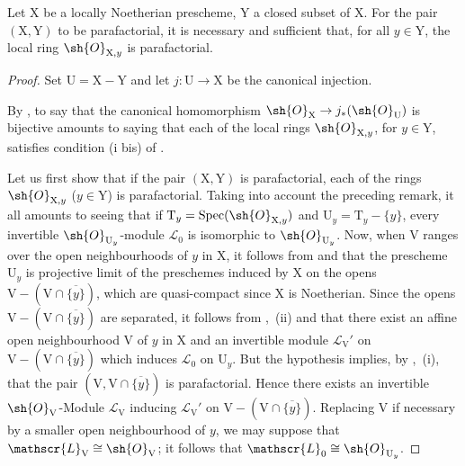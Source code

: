 \begin{proposition}[21.13.10]
\label{IV.21.13.10}
Let $\mathrm{X}$ be a locally Noetherian prescheme, $\mathrm{Y}$ a closed subset of $\mathrm{X}$.
For the pair $(\mathrm{X},\mathrm{Y})$ to be parafactorial, it is necessary and sufficient that, for all $y\in\mathrm{Y}$, the local ring $\sh{O}_{\mathrm{X},y}$ is parafactorial.
\end{proposition}

\begin{proof}
Set $\mathrm{U}=\mathrm{X}-\mathrm{Y}$ and let $j:\mathrm{U}\to\mathrm{X}$ be the canonical injection.

By , to say that the canonical homomorphism $\sh{O}_{\mathrm{X}}\to j_*(\sh{O}_{\mathrm{U}})$ is bijective amounts to saying that each of the local rings $\sh{O}_{\mathrm{X},y}$, for $y\in\mathrm{Y}$, satisfies condition (i bis) of .

Let us first show that if the pair $(\mathrm{X},\mathrm{Y})$ is parafactorial, each of the rings $\sh{O}_{\mathrm{X},y}$ ($y\in\mathrm{Y}$) is parafactorial.
Taking into account the preceding remark, it all amounts to seeing that if $\mathrm{T}_y=\operatorname{Spec}(\sh{O}_{\mathrm{X},y})$ and $\mathrm{U}_y=\mathrm{T}_y-\{y\}$, every invertible $\sh{O}_{\mathrm{U}_y}$-module $\mathscr{L}_0$ is isomorphic to $\sh{O}_{\mathrm{U}_y}$.
Now, when $\mathrm{V}$ ranges over the open neighbourhoods of $y$ in $\mathrm{X}$, it follows from  and  that the prescheme $\mathrm{U}_y$ is projective limit of the preschemes induced by $\mathrm{X}$ on the opens $\mathrm{V}-(\mathrm{V}\cap\overline{\{y\}})$, which are quasi-compact since $\mathrm{X}$ is Noetherian.
Since the opens $\mathrm{V}-(\mathrm{V}\cap\overline{\{y\}})$ are separated, it follows from ,~(ii) and  that there exist an affine open neighbourhood $\mathrm{V}$ of $y$ in $\mathrm{X}$ and an invertible module $\mathscr{L}_{\mathrm{V}}'$ on $\mathrm{V}-(\mathrm{V}\cap\overline{\{y\}})$ which induces $\mathscr{L}_0$ on $\mathrm{U}_y$.
But the hypothesis implies, by ,~(i), that the pair $(\mathrm{V},\mathrm{V}\cap\overline{\{y\}})$ is parafactorial. Hence there exists an invertible $\sh{O}_{\mathrm{V}}$-Module $\mathscr{L}_{\mathrm{V}}$ inducing $\mathscr{L}_{\mathrm{V}}'$ on $\mathrm{V}-(\mathrm{V}\cap\overline{\{y\}})$. Replacing $\mathrm{V}$ if necessary by a smaller open neighbourhood of $y$, we may suppose that $\mathscr{L}_{\mathrm{V}}\cong\sh{O}_{\mathrm{V}}$; it follows that $\mathscr{L}_0\cong\sh{O}_{\mathrm{U}_y}$.


\end{proof}
